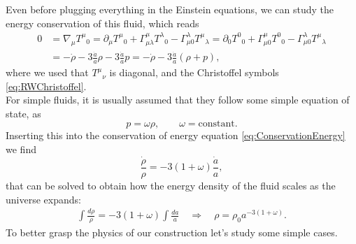 Even before plugging everything in the Einstein equations, we can study the energy conservation of this fluid, which reads
\begin{align}\label{eq:ConservationEnergy}
    0&=\nabla_\mu T^\mu\phantom{} _0=\partial_\mu T^\mu\phantom{} _0+\Gamma^\mu_{\mu\lambda}T^\lambda\phantom{} _0-\Gamma^\lambda_{\mu0}T^\mu\phantom{} _\lambda=\partial_0 T^0\phantom{} _0+\Gamma^\mu_{\mu0}T^0\phantom{} _0-\Gamma^\lambda_{\mu0}T^\mu\phantom{} _\lambda\nonumber\\
    &=-\dot\rho-3\frac{\dot a}{a}\rho-3\frac{\dot a}{a}p=-\dot\rho-3\frac{\dot a}{a}(\rho+p),
\end{align}
where we used that $T^\mu\phantom{}_\nu$ is diagonal, and the Christoffel symbols \eqref{eq:RWChristoffel}.\\
For simple fluids, it is usually assumed that they follow some simple equation of state, as
\begin{equation}\label{eq:EquationState}
    p=\omega\rho,\qquad\omega=\text{constant}.
\end{equation}
Inserting this into the conservation of energy equation \eqref{eq:ConservationEnergy} we find
\begin{equation*}
    \frac{\dot\rho}{\rho}=-3(1+\omega)\frac{\dot a }{a},
\end{equation*}
that can be solved to obtain how the energy density of the fluid scales as the universe expands:
\begin{align*}
    \int \frac{d\rho}{\rho}=-3(1+\omega)\int \frac{da}{a} \quad\Rightarrow\quad \boxed{\rho=\rho_0a^{-3(1+\omega)}}.
\end{align*}
To better grasp the physics of our construction let's study some simple cases.
